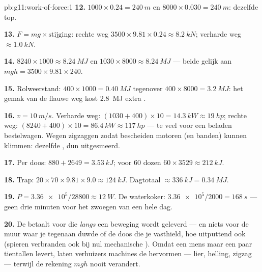 \begin{solution}{pb:g11:work-of-force:1}
\textbf{12.} $1000 \times 0.24 = \qty{240}{m}$ en
$8000 \times 0.030 = \qty{240}{m}$: dezelfde top.

\textbf{13.} $F = mg \times \text{stijging}$: rechte weg
$3500 \times 9.81 \times 0.24 \approx \qty{8.2}{kN}$; verharde weg
$\approx \qty{1.0}{kN}$.

\textbf{14.} $8240 \times 1000 \approx \qty{8.24}{MJ}$ en
$1030 \times 8000 \approx \qty{8.24}{MJ}$ --- beide gelijk aan
$mgh = 3500 \times 9.81 \times 240$.

\textbf{15.} Rolweerstand: $400 \times 1000 = \qty{0.40}{MJ}$ tegenover
$400 \times 8000 = \qty{3.2}{MJ}$: het gemak van de flauwe weg kost
\qty{2.8}{MJ} extra .

\textbf{16.} $v = \qty{10}{m/s}$. Verharde weg:
$(1030 + 400) \times 10 = \qty{14.3}{kW} \approx \qty{19}{hp}$; rechte
weg: $(8240 + 400) \times 10 = \qty{86.4}{kW} \approx \qty{117}{hp}$ ---
te veel voor een beladen bestelwagen. Wegen zigzaggen zodat bescheiden
motoren (en banden) kunnen klimmen: dezelfde , dun uitgesmeerd.

\textbf{17.} Per doos: $880 + 2649 = \qty{3.53}{kJ}$; voor $60$ dozen
$60 \times 3529 \approx \qty{212}{kJ}$.

\textbf{18.} Trap: $20 \times 70 \times 9.81 \times 9.0 \approx
\qty{124}{kJ}$. Dagtotaal $\approx \qty{336}{kJ} = \qty{0.34}{MJ}$.

\textbf{19.} $P = \num{3.36e5}/28800 \approx \qty{12}{W}$. De
waterkoker: $\num{3.36e5}/2000 = \qty{168}{s}$ --- geen drie minuten
voor het zwoegen van een hele dag.

\textbf{20.} De  betaalt voor  die \emph{langs} een beweging
wordt geleverd --- en niets voor de muur waar je tegenaan duwde of de
doos die je vasthield, hoe uitputtend ook (spieren verbranden  ook bij nul mechanische ). Omdat een mens maar een paar
tientallen  levert, laten verhuizers machines de  hervormen ---
lier, helling, zigzag --- terwijl de rekening $mgh$ nooit verandert.
\end{solution}
